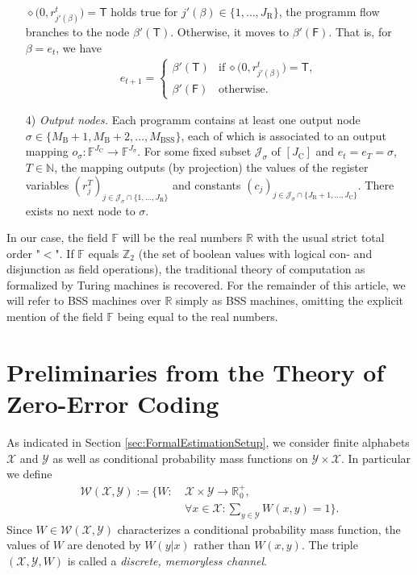 \documentclass[conference]{IEEEtran}
\def\X{{\mathcal X}}
\def\Y{{\mathcal Y}}
\def\J{{\mathcal J}}
\def\W{{\mathcal W}}
\def\NN{{\mathbb N}}
\def\RR{{\mathbb R}}
\def\ZZ{{\mathbb Z}}
\def\FF{{\mathbb F}}
\newcommand{\BSS}{\mathrm{BSS}}
\begin{document}
\begin{itemize}
						\(	\diamond\big(0, r^t_{j'(\beta)}\big) = \mathsf{T} 
						\)
						holds true for \(j'(\beta) \in \{1,\ldots, J_\mathrm{R}\}\), the programm flow branches to the node \(\beta'(\mathsf{T})\). Otherwise, it moves to \(\beta'(\mathsf{F})\). 
						That is, for \(\beta = e_t\), we have
						\begin{align*}   e_{t+1} =   \begin{cases}   \beta'(\mathsf{T})  &\text{if}~\diamond\big(0,r^t_{j'(\beta)}\big) = \mathsf{T},\\
																	\beta'(\mathsf{F})  &\text{otherwise}.
													\end{cases}    
						\end{align*}
					\item[4)] \emph{Output nodes.} Each programm contains at least one output node \(\sigma \in \{M_{\mathrm{B}} + 1, M_{\mathrm{B}} + 2,\ldots, M_\BSS\}\), 
						each of which is associated to an output mapping
						\(	o_\sigma : \FF^{J_{\mathrm{C}}}\rightarrow \FF^{J_{\sigma}}.
						\)
						For some fixed subset \(\J_\sigma\) of \([J_\mathrm{C}]\) and \(e_t = e_T = \sigma\), \(T\in\NN\), the mapping outputs (by projection) the values of the 
						register variables \((r_j^T)_{j\in \J_\sigma \cap \{1,\ldots,J_\mathrm{R}\}}\) and constants \((c_j)_{j\in \J_\sigma \cap \{J_\mathrm{R}+1,\ldots,J_\mathrm{C}\}}\). 
						There exists no next node to \(\sigma\).
	\end{itemize}
	In our case, the field \(\FF\) will be the real numbers \(\RR\) with the usual strict total order "\(<\)". If \(\FF\) equals \(\ZZ_2\) (the set of boolean values with logical con- and disjunction 
	as field operations), the traditional theory of computation as formalized by Turing machines is recovered. For the remainder of this article, we will refer to BSS machines over \(\RR\) 
	simply as BSS machines, omitting the explicit mention of the field \(\FF\) being equal to the real numbers. 

\section{Preliminaries from the Theory of Zero-Error Coding}	\label{sec:PreliminariesZeroError}
	\noindent As indicated in Section \ref{sec:FormalEstimationSetup}, we consider finite alphabets \(\X\) and \(\Y\) as well as conditional probability mass functions on \(\Y\times\X\).
	In particular we define
	\begin{align*}	\W(\X,\Y)	:=	\bigg\{ W: 	&~\X \times \Y \rightarrow\RR_{\hspace{1pt}0}^+, \\
												&~\forall x\in\X: {\sum}_{y\in\Y} W(x,y) = 1 \bigg\}.
	\end{align*}
	Since \(W\in \W(\X,\Y)\) characterizes a conditional probability mass function, the values of \(W\) are denoted by \(W(y|x)\) rather than \(W(x,y)\).  
	The triple \((\X,\Y,W)\) is called a \emph{discrete, memoryless channel}. 
\end{document}
